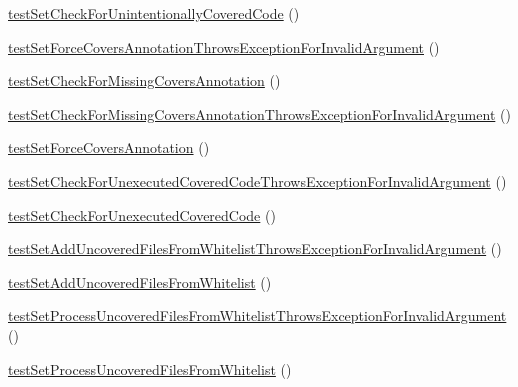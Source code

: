 \begin{DoxyCompactItemize}
\item 
\mbox{\hyperlink{class_sebastian_bergmann_1_1_code_coverage_1_1_code_coverage_test_a3750fb50e6b54e66fe0de1614e3ea938}{test\+Set\+Check\+For\+Unintentionally\+Covered\+Code}} ()
\item 
\mbox{\hyperlink{class_sebastian_bergmann_1_1_code_coverage_1_1_code_coverage_test_abafcb0783095a687186de10458acbde8}{test\+Set\+Force\+Covers\+Annotation\+Throws\+Exception\+For\+Invalid\+Argument}} ()
\item 
\mbox{\hyperlink{class_sebastian_bergmann_1_1_code_coverage_1_1_code_coverage_test_ab0dd39fe8d1756a8b042a905d398261d}{test\+Set\+Check\+For\+Missing\+Covers\+Annotation}} ()
\item 
\mbox{\hyperlink{class_sebastian_bergmann_1_1_code_coverage_1_1_code_coverage_test_a961742272dd93f0a07d49585737ee440}{test\+Set\+Check\+For\+Missing\+Covers\+Annotation\+Throws\+Exception\+For\+Invalid\+Argument}} ()
\item 
\mbox{\hyperlink{class_sebastian_bergmann_1_1_code_coverage_1_1_code_coverage_test_aed551c2348730f148de28016fdee2d2d}{test\+Set\+Force\+Covers\+Annotation}} ()
\item 
\mbox{\hyperlink{class_sebastian_bergmann_1_1_code_coverage_1_1_code_coverage_test_ad3756bd896de574c801c7006645efbdd}{test\+Set\+Check\+For\+Unexecuted\+Covered\+Code\+Throws\+Exception\+For\+Invalid\+Argument}} ()
\item 
\mbox{\hyperlink{class_sebastian_bergmann_1_1_code_coverage_1_1_code_coverage_test_a54ef2f2ccd9ae5c3f07b4fdbc7c9abfe}{test\+Set\+Check\+For\+Unexecuted\+Covered\+Code}} ()
\item 
\mbox{\hyperlink{class_sebastian_bergmann_1_1_code_coverage_1_1_code_coverage_test_ad82b6a5a07b862e06aed503cf8874a1e}{test\+Set\+Add\+Uncovered\+Files\+From\+Whitelist\+Throws\+Exception\+For\+Invalid\+Argument}} ()
\item 
\mbox{\hyperlink{class_sebastian_bergmann_1_1_code_coverage_1_1_code_coverage_test_ab2192c7d76ab3e9072fe6ff53ff0cab7}{test\+Set\+Add\+Uncovered\+Files\+From\+Whitelist}} ()
\item 
\mbox{\hyperlink{class_sebastian_bergmann_1_1_code_coverage_1_1_code_coverage_test_ae05b750a62151c304754ed3dde4bc5fa}{test\+Set\+Process\+Uncovered\+Files\+From\+Whitelist\+Throws\+Exception\+For\+Invalid\+Argument}} ()
\item 
\mbox{\hyperlink{class_sebastian_bergmann_1_1_code_coverage_1_1_code_coverage_test_afaca377a7fc161ab2205cfb4b7a14e41}{test\+Set\+Process\+Uncovered\+Files\+From\+Whitelist}} ()

\end{DoxyCompactItemize}
